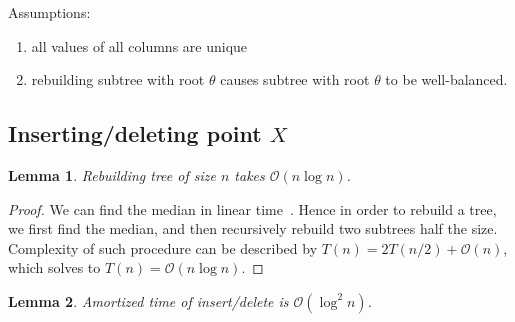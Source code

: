 \documentclass[10pt,a4paper]{article}
\newtheorem{lemma}{Lemma}
\newcommand{\Oh}{\mathcal{O}}
\begin{document}
Assumptions:
\begin{enumerate}
\item all values of all columns are unique
\item rebuilding subtree with root $\theta$ causes subtree with root $\theta$ to be well-balanced.
\end{enumerate}

\subsection{Inserting/deleting point $X$}

\begin{lemma}\label{lem:1}
Rebuilding tree of size $n$ takes $\Oh(n \log n)$.
\end{lemma}

\begin{proof}
We can find the median in linear time~\cite{FIVE}. Hence in order to rebuild a tree, we first find the median, and then recursively rebuild two subtrees half the size. Complexity of such procedure can be described by $T(n) = 2 T(n/2) + \Oh(n)$, which solves to $T(n) = \Oh(n \log n).$
\end{proof}

\begin{lemma}\label{lem:2}
Amortized time of insert/delete is $\Oh(\log^2 n)$.
\end{lemma}
\end{document}
